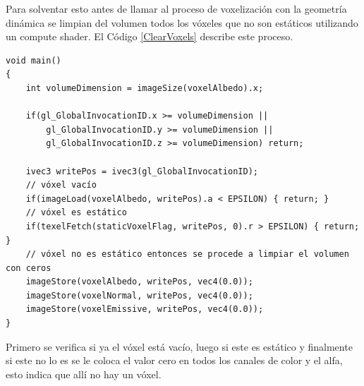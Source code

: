 Para solventar esto antes de llamar al proceso de voxelización con la geometría dinámica se limpian del volumen todos los vóxeles que no son estáticos utilizando un compute shader. El Código \ref{ClearVoxels} describe este proceso.
\\
\begin{lstlisting}[caption={Limpieza de vóxeles no estáticos.}, label=ClearVoxels]
void main()
{
    int volumeDimension = imageSize(voxelAlbedo).x;

    if(gl_GlobalInvocationID.x >= volumeDimension ||
        gl_GlobalInvocationID.y >= volumeDimension ||
        gl_GlobalInvocationID.z >= volumeDimension) return;

    ivec3 writePos = ivec3(gl_GlobalInvocationID);
    // vóxel vacío
    if(imageLoad(voxelAlbedo, writePos).a < EPSILON) { return; }
    // vóxel es estático
    if(texelFetch(staticVoxelFlag, writePos, 0).r > EPSILON) { return; }
    // vóxel no es estático entonces se procede a limpiar el volumen con ceros
    imageStore(voxelAlbedo, writePos, vec4(0.0));
    imageStore(voxelNormal, writePos, vec4(0.0));
    imageStore(voxelEmissive, writePos, vec4(0.0));
}
\end{lstlisting}

Primero se verifica si ya el vóxel está vacío, luego si este es estático y finalmente si este no lo es se le coloca el valor cero en todos los canales de color y el alfa, esto indica que allí no hay un vóxel.
